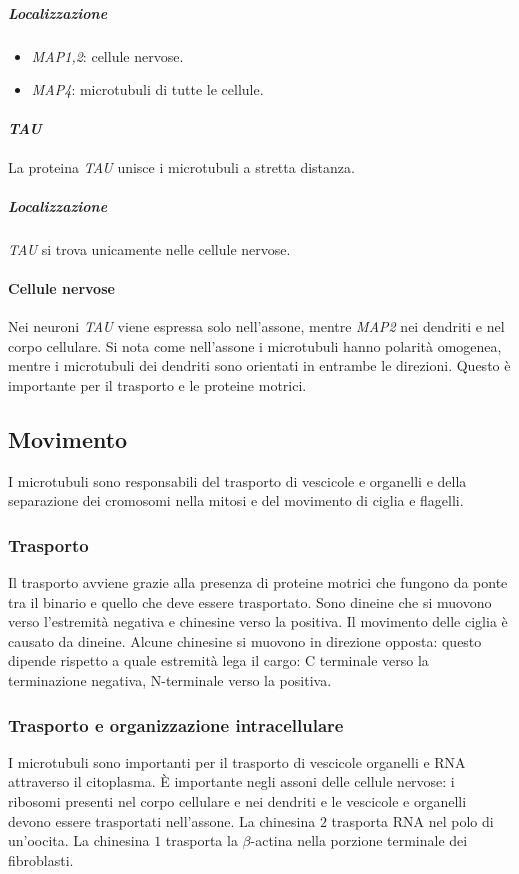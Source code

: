 				\subparagraph{Localizzazione}
				\begin{multicols}{2}
					\begin{itemize}
						\item \emph{MAP1,2}: cellule nervose.
						\item \emph{MAP4}: microtubuli di tutte le cellule.
					\end{itemize}
				\end{multicols}

			\paragraph{\emph{TAU}}
			La proteina \emph{TAU} unisce i microtubuli a stretta distanza.

				\subparagraph{Localizzazione}
				\emph{TAU} si trova unicamente nelle cellule nervose.


			\paragraph{Cellule nervose}
			Nei neuroni \emph{TAU} viene espressa solo nell'assone, mentre \emph{MAP2} nei dendriti e nel corpo cellulare.
			Si nota come nell'assone i microtubuli hanno polarit\`a omogenea, mentre i microtubuli dei dendriti sono orientati in entrambe le direzioni.
			Questo \`e importante per il trasporto e le proteine motrici.

	\subsection{Movimento}
	I microtubuli sono responsabili del trasporto di vescicole e organelli e della separazione dei cromosomi nella mitosi e del movimento di ciglia e flagelli.

		\subsubsection{Trasporto}
		Il trasporto avviene grazie alla presenza di proteine motrici che fungono da ponte tra il binario e quello che deve essere trasportato.
		Sono dineine che si muovono verso l'estremit\`a negativa e chinesine verso la positiva.
		Il movimento delle ciglia \`e causato da dineine.
		Alcune chinesine si muovono in direzione opposta: questo dipende rispetto a quale estremit\`a lega il cargo: C terminale verso la terminazione negativa, N-terminale verso la positiva.

		\subsubsection{Trasporto e organizzazione intracellulare}
		I microtubuli sono importanti per il trasporto di vescicole organelli e RNA attraverso il citoplasma.
		\`E importante negli assoni delle cellule nervose: i ribosomi presenti nel corpo cellulare e nei dendriti e le vescicole e organelli devono essere trasportati nell'assone.
		La chinesina $2$ trasporta RNA nel polo di un'oocita.
		La chinesina $1$ trasporta la $\beta$-actina nella porzione terminale dei fibroblasti.

